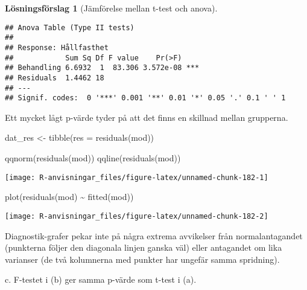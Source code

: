\documentclass[
]{book}
\newenvironment{Shaded}{\begin{snugshade}}{\end{snugshade}}
\newcommand{\AttributeTok}[1]{\textcolor[rgb]{0.77,0.63,0.00}{#1}}
\newcommand{\FunctionTok}[1]{\textcolor[rgb]{0.00,0.00,0.00}{#1}}
\newcommand{\NormalTok}[1]{#1}
\newcommand{\OtherTok}[1]{\textcolor[rgb]{0.56,0.35,0.01}{#1}}
\newcommand{\SpecialCharTok}[1]{\textcolor[rgb]{0.00,0.00,0.00}{#1}}
\theoremstyle{definition}
\theoremstyle{definition}
\theoremstyle{definition}
\theoremstyle{definition}
\newtheorem{hypothesis}{Lösningsförslag}[chapter]
\theoremstyle{remark}
\begin{document}
\begin{hypothesis}[Jämförelse mellan t-test och anova]
\begin{verbatim}
## Anova Table (Type II tests)
## 
## Response: Hållfasthet
##            Sum Sq Df F value    Pr(>F)    
## Behandling 6.6932  1  83.306 3.572e-08 ***
## Residuals  1.4462 18                      
## ---
## Signif. codes:  0 '***' 0.001 '**' 0.01 '*' 0.05 '.' 0.1 ' ' 1
\end{verbatim}

Ett mycket lågt p-värde tyder på att det finns en skillnad mellan grupperna.

\begin{Shaded}
\begin{Highlighting}[]
\NormalTok{dat\_res }\OtherTok{\textless{}{-}} \FunctionTok{tibble}\NormalTok{(}\AttributeTok{res =} \FunctionTok{residuals}\NormalTok{(mod))}

\FunctionTok{qqnorm}\NormalTok{(}\FunctionTok{residuals}\NormalTok{(mod))}
\FunctionTok{qqline}\NormalTok{(}\FunctionTok{residuals}\NormalTok{(mod))}
\end{Highlighting}
\end{Shaded}

\begin{center}\texttt{[image: R-anvisningar\_files/figure-latex/unnamed-chunk-182-1]} \end{center}

\begin{Shaded}
\begin{Highlighting}[]
\FunctionTok{plot}\NormalTok{(}\FunctionTok{residuals}\NormalTok{(mod) }\SpecialCharTok{\textasciitilde{}} \FunctionTok{fitted}\NormalTok{(mod))}
\end{Highlighting}
\end{Shaded}

\begin{center}\texttt{[image: R-anvisningar\_files/figure-latex/unnamed-chunk-182-2]} \end{center}

Diagnostik-grafer pekar inte på några extrema avvikelser från normalantagandet (punkterna följer den diagonala linjen ganska väl) eller antagandet om lika varianser (de två kolumnerna med punkter har ungefär samma spridning).

c. F-testet i (b) ger samma p-värde som t-test i (a).
\end{hypothesis}
\end{document}
